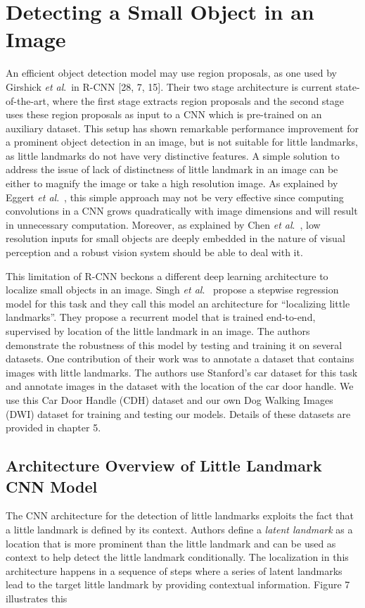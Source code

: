 \documentclass [11pt,letterpaper ,twoside ,openany ]{report}
\begin{document}
    \chapter{Detecting a Small Object in an Image}
    \doublespacing
    An efficient object detection model may use region proposals, as  one used by Girshick \textit{et al}.\ in R-CNN [28, 7, 15]. Their two stage architecture is current state-of-the-art, where the first stage extracts region proposals and the second stage uses these region proposals as input to a CNN which is pre-trained on an auxiliary dataset. This setup has shown remarkable performance improvement for a prominent object detection in an image, but is not suitable for little landmarks, as little landmarks do not have very distinctive features. A simple solution to address the issue of lack of distinctness of little landmark in an image can be either to magnify the image or take a high resolution image. As explained by Eggert \textit{et al}.\ \cite{eggert2017improving}, this simple approach may not be very effective since computing convolutions in a CNN grows quadratically with image dimensions and will result in unnecessary computation. Moreover, as explained by Chen \textit{et al}.\ \cite{chen2016r}, low resolution inputs for small objects are deeply embedded  in the nature of visual perception and a robust vision system should be able to deal with it.
        
    This limitation of R-CNN beckons a different deep learning architecture to localize small objects in an image. Singh \textit{et al}.\ \cite{Singh_2016_CVPR} propose a stepwise regression model for this task and they call this model an architecture for ``localizing little landmarks''. They propose a recurrent model that is trained end-to-end, supervised by location of the little landmark in an image. The authors demonstrate the robustness of this model by testing and training it on several datasets. One contribution of their work was to annotate a dataset that contains images with little landmarks. The authors use Stanford's car dataset \cite{krause20133d} for this task and annotate images in the dataset with the location of the car door handle. We use this Car Door Handle (CDH) dataset and our own Dog Walking Images (DWI) dataset for training and testing our models. Details of these datasets are provided in chapter 5.

    \section{Architecture Overview of Little Landmark CNN Model}
    The CNN architecture for the detection of little landmarks \cite{Singh_2016_CVPR} exploits the fact that a little landmark is defined by its context. Authors define a \textit {latent landmark} as a location that is more prominent than the little landmark and can be used as context to help detect the little landmark conditionally. The localization in this architecture happens in a sequence of steps where a series of latent landmarks lead to the target little landmark by providing contextual information. Figure 7 illustrates this 
\end{document}
